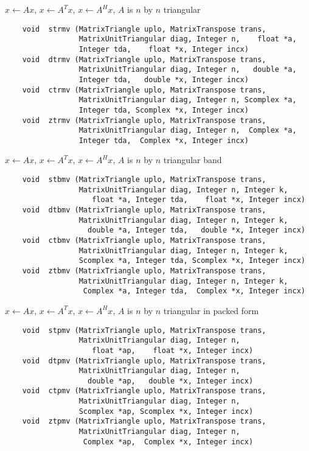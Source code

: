 \normalsize
$x \leftarrow Ax$, $x \leftarrow A^T x$, $x \leftarrow A^H x$, 
$A$ is $n$ by $n$ triangular
\footnotesize
\begin{verbatim}
    void  strmv (MatrixTriangle uplo, MatrixTranspose trans,
                 MatrixUnitTriangular diag, Integer n,    float *a,
                 Integer tda,    float *x, Integer incx)
    void  dtrmv (MatrixTriangle uplo, MatrixTranspose trans,
                 MatrixUnitTriangular diag, Integer n,   double *a,
                 Integer tda,   double *x, Integer incx)
    void  ctrmv (MatrixTriangle uplo, MatrixTranspose trans,
                 MatrixUnitTriangular diag, Integer n, Scomplex *a,
                 Integer tda, Scomplex *x, Integer incx)
    void  ztrmv (MatrixTriangle uplo, MatrixTranspose trans,
                 MatrixUnitTriangular diag, Integer n,  Complex *a,
                 Integer tda,  Complex *x, Integer incx) 
\end{verbatim}
\normalsize
$x \leftarrow Ax$, $x \leftarrow A^T x$, $x \leftarrow A^H x$, 
$A$ is $n$ by $n$ triangular band
\footnotesize
\begin{verbatim}
    void  stbmv (MatrixTriangle uplo, MatrixTranspose trans,
                 MatrixUnitTriangular diag, Integer n, Integer k,
                    float *a, Integer tda,    float *x, Integer incx)
    void  dtbmv (MatrixTriangle uplo, MatrixTranspose trans,
                 MatrixUnitTriangular diag, Integer n, Integer k,
                   double *a, Integer tda,   double *x, Integer incx)
    void  ctbmv (MatrixTriangle uplo, MatrixTranspose trans,
                 MatrixUnitTriangular diag, Integer n, Integer k,
                 Scomplex *a, Integer tda, Scomplex *x, Integer incx)
    void  ztbmv (MatrixTriangle uplo, MatrixTranspose trans,
                 MatrixUnitTriangular diag, Integer n, Integer k,
                  Complex *a, Integer tda,  Complex *x, Integer incx)
\end{verbatim}
\normalsize
$x \leftarrow Ax$, $x \leftarrow A^T x$, $x \leftarrow A^H x$, 
$A$ is $n$ by $n$ triangular in packed form
\footnotesize
\begin{verbatim}
    void  stpmv (MatrixTriangle uplo, MatrixTranspose trans,
                 MatrixUnitTriangular diag, Integer n,
                    float *ap,    float *x, Integer incx)
    void  dtpmv (MatrixTriangle uplo, MatrixTranspose trans,
                 MatrixUnitTriangular diag, Integer n,
                   double *ap,   double *x, Integer incx)
    void  ctpmv (MatrixTriangle uplo, MatrixTranspose trans,
                 MatrixUnitTriangular diag, Integer n,
                 Scomplex *ap, Scomplex *x, Integer incx)
    void  ztpmv (MatrixTriangle uplo, MatrixTranspose trans,
                 MatrixUnitTriangular diag, Integer n,
                  Complex *ap,  Complex *x, Integer incx)
\end{verbatim}
